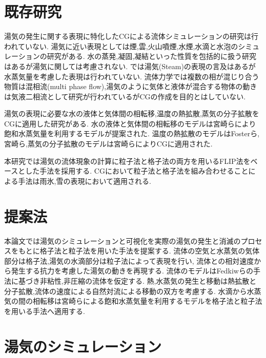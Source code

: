 \documentclass[submit,techrep]{ipsj}
\begin{document}

\section{既存研究}

湯気の発生に関する表現に特化したCGによる流体シミュレーションの研究は行われていない.
湯気に近い表現としては煙\cite{Fedkiw2001},雲\cite{Dobashi2000}\cite{Miyazaki2001}\cite{Miyazaki2002},火山噴煙\cite{Mizuno2003}\cite{Mizuno2004},水煙\cite{Nielsen2013},水滴と水泡\cite{Mihalef2009}のシミュレーションの研究がある.
水の蒸発,凝固,凝結といった性質を包括的に扱う研究\cite{Fujisawa2008}はあるが湯気に関しては考慮されない.
\cite{Foster1997}では湯気(Steam)の表現の言及はあるが水蒸気量を考慮した表現は行われていない.
流体力学では複数の相が混じり合う物質は混相流(multi phase flow),湯気のように気体と液体が混合する物体の動きは気液二相流として研究が行われているがCGの作成を目的とはしていない.

湯気の表現に必要な水の液体と気体間の相転移,温度の熱拡散,蒸気の分子拡散をCGに適用した研究がある.
水の液体と気体間の相転移のモデルは宮崎ら\cite{Miyazaki2001}\cite{Miyazaki2002}により飽和水蒸気量を利用するモデルが提案された.
温度の熱拡散のモデルはFosterら\cite{Foster1997},宮崎ら\cite{Miyazaki2002},蒸気の分子拡散のモデルは宮崎ら\cite{Miyazaki2002}によりCGに適用された.

本研究では湯気の流体現象の計算に粒子法と格子法の両方を用いるFLIP法をベースとした手法を採用する.
CGにおいて粒子法と格子法を組み合わせることによる手法は雨氷\cite{Ishikawa2015},雪\cite{Stomakhin2013}の表現において適用される.

\section{提案法}
本論文では湯気のシミュレーションと可視化を実際の湯気の発生と消滅のプロセスをもとに格子法と粒子法を用いた手法を提案する.
流体の空気と水蒸気の気体部分は格子法,湯気の水滴部分は粒子法によって表現を行い,
流体との相対速度から発生する抗力を考慮した湯気の動きを再現する.
流体のモデルはFedkiwら\cite{Fedkiw2001}の手法に基づき非粘性,非圧縮の流体を仮定する.
熱,水蒸気の発生と移動は熱拡散と分子拡散,流体の速度による自然対流による移動の双方を考慮する.
水滴から水蒸気の間の相転移は宮崎ら\cite{Miyazaki2001}\cite{Miyazaki2002}による飽和水蒸気量を利用するモデルを格子法と粒子法を用いる手法へ適用する.

\section{湯気のシミュレーション}
\end{document}
